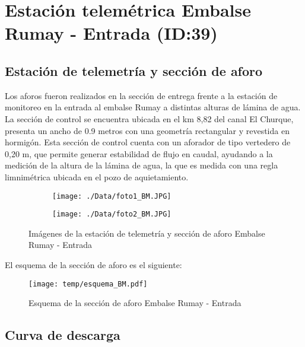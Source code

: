\documentclass[]{article}
\begin{document}
\clearpage
\section{Estación telemétrica Embalse Rumay - Entrada (ID:39)}

\subsection{Estación de telemetría y sección de aforo}

Los aforos fueron realizados en la sección de entrega frente a la estación de monitoreo en la entrada al embalse Rumay a distintas alturas de lámina de agua. La sección de control se encuentra ubicada en el km 8,82 del canal El Churque, presenta un ancho de 0.9 metros con una geometría rectangular y revestida en hormigón. Esta sección de control cuenta con un aforador de tipo vertedero de 0,20 m, que permite generar estabilidad de flujo en caudal, ayudando a la medición de la altura de la lámina de agua, la que es medida con una regla limnimétrica ubicada en el pozo de aquietamiento.


\begin{figure}[H]
  \centering
\begin{subfigure}{.49\textwidth}
  \texttt{[image: ./Data/foto1\_BM.JPG]}
\end{subfigure}
\hfill
\begin{subfigure}{.49\textwidth}
  \texttt{[image: ./Data/foto2\_BM.JPG]}
\end{subfigure}
\caption{Imágenes de la estación de telemetría y sección de aforo Embalse Rumay - Entrada}
\label{fig:fotos_39}
\end{figure}

El esquema de la sección de aforo es el siguiente:

\begin{figure}[H]
  \centering
  \texttt{[image: temp/esquema\_BM.pdf]}
\caption{Esquema de la sección de aforo Embalse Rumay - Entrada}
\label{fig:Esquema_BM}
\end{figure}

\subsection{Curva de descarga}\label{curva-de-descarga-38}
\end{document}
